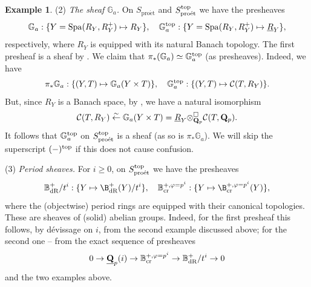 \documentclass[10pt]{amsart}
\theoremstyle{definition}
\newtheorem{example}[equation]{Example}
\theoremstyle{remark}
\def\phi{\varphi}
\newcommand{\dr}{\operatorname{dR} }
\newcommand{\proeet}{\operatorname{pro\acute{e}t} }
\newcommand{\crr}{\operatorname{cr} }
\newcommand{\scc}{{\mathcal{C}}}
\numberwithin{equation}{section}
\def\Q{{\bf Q}} \def\Z{{\bf Z}}
\numberwithin{equation}{section}
\begin{document}
\begin{example}
 (2) {\em The sheaf ${\mathbb G}_a$.}  On $S_{\proeet}$ and $S_{\proeet}^{\rm top}$ we have the presheaves 
 $${\mathbb G}_a: \{Y={\rm Spa}(R_Y,R^+_Y)\mapsto {R_Y}\},\quad {\mathbb G}^{\rm top}_a: \{Y={\rm Spa}(R_Y,R^+_Y)\mapsto \underline{R}_Y\},
 $$ respectively,  where $R_Y$ is equipped with its natural  Banach topology.  The first presheaf is a sheaf by \cite[Th. 8.7]{SchD}. 
 We claim that  $\pi_*({\mathbb G}_a)\simeq {\mathbb G}^{\rm top}_a$ (as presheaves). Indeed, we have
 \begin{align*}
 \pi_*{\mathbb G}_a:\{(Y,T)\mapsto {\mathbb G}_a(Y\times {T})\},\quad 
  {{\mathbb G}^{\rm top}_a}: \{(Y,T)\mapsto \scc(T,R_Y)\}.
 \end{align*}
 But, since $R_Y$ is a Banach space, by \cite[Cor. 10.5.4]{PGS},  we have a natural isomorphism
 $$
 \scc(T,R_Y)\stackrel{\sim}{\leftarrow} {\mathbb G}_a(Y\times {T})=\underline{R}_Y{\otimes}^{\Box}_{\Q_p}\scc(T,\Q_p).
 $$
 It follows that ${\mathbb G}^{\rm top}_a$ on $S^{\rm top}_{\proeet}$ is a sheaf (as so is $\pi_*{\mathbb G}_a$). We will skip the superscript $(-)^{\rm top}$ if this does not cause confusion.
 

  (3) {\em Period sheaves.}   For $i\geq 0$, on $S_{\proeet}^{\rm top}$ we have the presheaves 
 \begin{equation}\label{periods1}
 \mathbb{B}^+_{\dr}/t^i :\{Y\mapsto { \B}^+_{\dr}(Y)/t^i\}, \quad \mathbb{B}^{+,\phi=p^i}_{\crr}: \{Y\mapsto {\B}^{+,\phi=p^i}_{\crr}(Y)\},
 \end{equation}
 where the (objectwise)  period rings are equipped with their canonical topologies. 
  These are sheaves of (solid) abelian groups. Indeed, for the first presheaf this follows,  by d\'evissage on $i$, from the second example discussed above; for the second one -- from the exact sequence of presheaves
  \begin{equation}\label{warsz11}
  0\to \underline{\Q}_p(i)\to\mathbb{B}^{+,\phi=p^i}_{\crr}\to  \mathbb{B}^+_{\dr}/t^i\to0
  \end{equation}
and the two examples above. 
  

\end{example}
\end{document}
